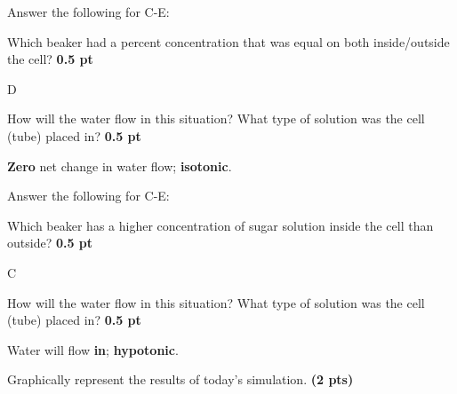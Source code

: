 \documentclass[12pt,a4paper]{article}
\begin{document}
\begin{enumerate}[font=\bfseries, wide, resume]
    {\color{under}\item Answer the following for C-E:}
    \begin{enumerate}
        {\color{under}\item Which beaker had a percent concentration that was equal on both inside/outside the cell? \textbf{0.5 pt}}

        D

        {\color{under}\item How will the water flow in this situation? What type of solution was the cell (tube) placed in? \textbf{0.5 pt}}

        \textbf{Zero} net change in water flow; \textbf{isotonic}.
    \end{enumerate}

    {\color{under}\item Answer the following for C-E:}
    \begin{enumerate}
        {\color{under}\item Which beaker has a higher concentration of sugar solution inside the cell than outside?  \textbf{0.5 pt}}

        C 

        {\color{under}\item How will the water flow in this situation? What type of solution was the cell (tube) placed in? \textbf{0.5 pt}}

        Water will flow \textbf{in}; \textbf{hypotonic}.
    \end{enumerate}

    \newpage 

    {\color{under}\item Graphically represent the results of today’s simulation.  \textbf{(2 pts)}}


\end{enumerate}
\end{document}
